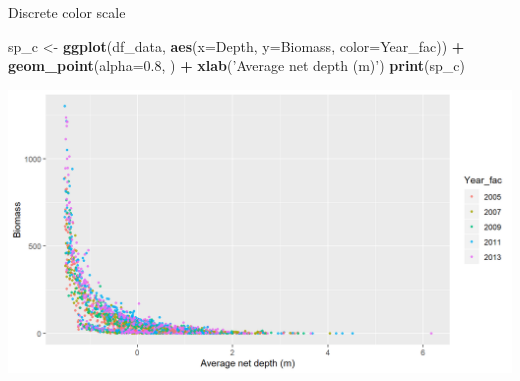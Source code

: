 \documentclass[
  ignorenonframetext,
]{beamer}
\newenvironment{Shaded}{\begin{snugshade}}{\end{snugshade}}
\newcommand{\DataTypeTok}[1]{\textcolor[rgb]{0.13,0.29,0.53}{#1}}
\newcommand{\FloatTok}[1]{\textcolor[rgb]{0.00,0.00,0.81}{#1}}
\newcommand{\KeywordTok}[1]{\textcolor[rgb]{0.13,0.29,0.53}{\textbf{#1}}}
\newcommand{\NormalTok}[1]{#1}
\newcommand{\OperatorTok}[1]{\textcolor[rgb]{0.81,0.36,0.00}{\textbf{#1}}}
\newcommand{\StringTok}[1]{\textcolor[rgb]{0.31,0.60,0.02}{#1}}
\begin{document}
\begin{frame}[fragile]{Discrete color scale}
\protect\hypertarget{discrete-color-scale}{}

\begin{Shaded}
\begin{Highlighting}[]
\NormalTok{sp_c <-}\StringTok{ }\KeywordTok{ggplot}\NormalTok{(df_data, }\KeywordTok{aes}\NormalTok{(}\DataTypeTok{x=}\NormalTok{Depth, }\DataTypeTok{y=}\NormalTok{Biomass,}
                            \DataTypeTok{color=}\NormalTok{Year_fac)) }\OperatorTok{+}
\StringTok{  }\KeywordTok{geom_point}\NormalTok{(}\DataTypeTok{alpha=}\FloatTok{0.8}\NormalTok{, ) }\OperatorTok{+}\StringTok{ }\KeywordTok{xlab}\NormalTok{(}\StringTok{'Average net depth (m)'}\NormalTok{)}
\KeywordTok{print}\NormalTok{(sp_c)}
\end{Highlighting}
\end{Shaded}

\begin{center}\includegraphics[width=0.8\linewidth]{figure/sp_discrete_color1-1} \end{center}

\end{frame}
\end{document}

